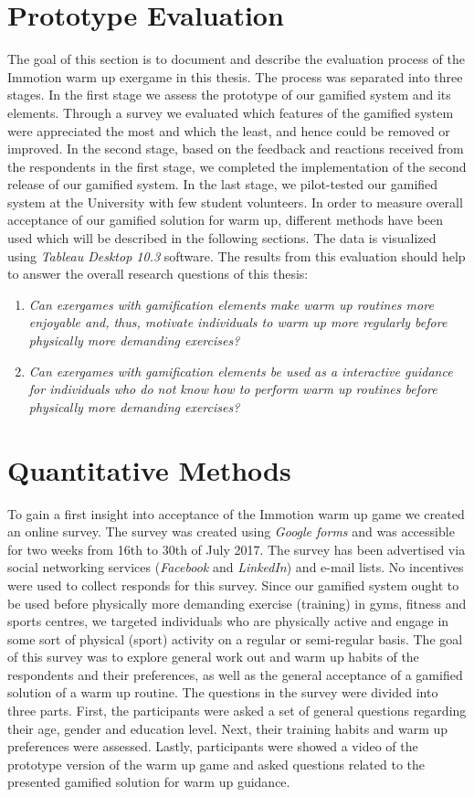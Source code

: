 \section{Prototype Evaluation}
The goal of this section is to document and describe the evaluation process of the Immotion warm up exergame in this thesis. The process was separated into three stages. In the first stage we assess the prototype of our gamified system and its elements. Through a survey we evaluated which features of the gamified system were appreciated the most and which the least, and hence could be removed or improved. In the second stage, based on the feedback and reactions received from the respondents in the first stage, we completed the implementation of the second release of our gamified system. In the last stage, we pilot-tested our gamified system at the University with few student volunteers. In order to measure overall acceptance of our gamified solution for warm up, different methods have been used which will be described in the following sections. The data is visualized using \textit{Tableau Desktop 10.3} software. The results from this evaluation should help to answer the overall research questions of this thesis:
\begin{enumerate}
\item \textit{Can exergames with gamification elements make warm up routines more enjoyable and, thus, motivate individuals to warm up more regularly before physically more demanding exercises?}
\item \textit{Can exergames with gamification elements be used as a interactive guidance for individuals who do not know how to perform warm up routines before physically more demanding exercises?}
\end{enumerate}
\section{Quantitative Methods}
To gain a first insight into acceptance of the Immotion warm up game we created an online survey. The survey was created using \textit{Google forms} and was accessible for two weeks from 16th to 30th of July 2017. The survey has been advertised via social networking services (\textit{Facebook} and \textit{LinkedIn}) and e-mail lists. No incentives were used to collect responds for this survey. Since our gamified system ought to be used before physically more demanding exercise (training) in gyms, fitness and sports centres, we targeted individuals who are physically active and engage in some sort of physical (sport) activity on a regular or semi-regular basis. The goal of this survey was to explore general work out and warm up habits of the respondents and their preferences, as well as the general acceptance of a gamified solution of a warm up routine. The questions in the survey were divided into three parts. First, the participants were asked a set of general questions regarding their age, gender and education level. Next, their training habits and warm up preferences were assessed. Lastly, participants were showed a video of the prototype version of the warm up game and asked questions related to the presented gamified solution for warm up guidance. 

